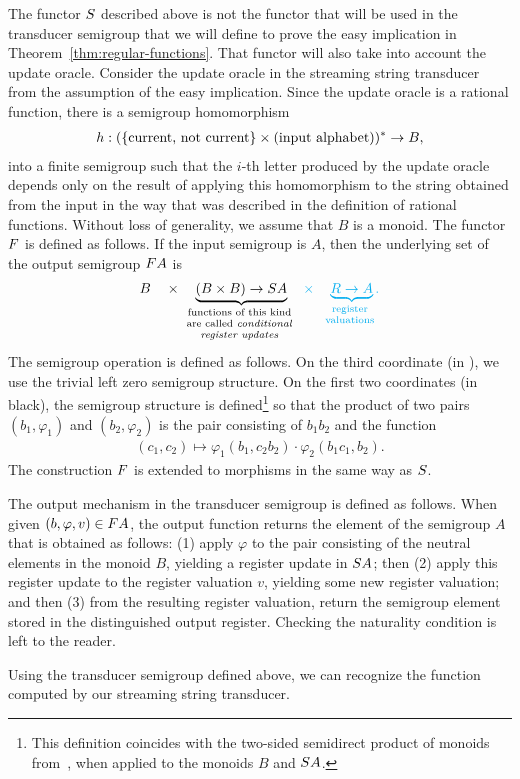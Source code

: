 The functor $\functors$ described above is not the functor that will be used in the transducer semigroup that we will define to prove the easy implication in Theorem~\ref{thm:regular-functions}. That functor will also take into account the update oracle. Consider the update oracle in the streaming string transducer from the assumption of the easy implication. Since the update oracle is a rational function, there is a semigroup homomorphism
\begin{align*}
h : (\{\text{current, not current}\} \times \text{(input alphabet)})^* \to B,
\end{align*}
into a finite semigroup such that the $i$-th letter produced by the update oracle depends only on the result of applying this homomorphism to the string obtained from the input in the way that was described in the definition of rational functions. Without loss of generality, we assume that $B$ is a monoid. The functor $\functor$ is defined as follows. If the input semigroup is $A$, then the underlying set of the output semigroup $\functor A$ is 
\begin{align*}
     B \quad \times \quad \myunderbrace{(B \times B) \to \functors A}{functions of this kind\\ are  called \emph{conditional} \\\emph{register updates}} 
\quad \blue{\times \quad \myunderbrace{R \to A}{register\\ valuations}.}
\end{align*}
The semigroup operation is defined as follows. On the third coordinate (in ), we use the trivial left zero semigroup structure. On the first two coordinates (in black), the semigroup structure is defined\footnote{This definition coincides with the two-sided semidirect product of monoids from~\cite[Section 6]{rhodes1989kernel}, when applied to the monoids $B$ and $\functors A$.} so that the product of two pairs $(b_1,\varphi_1)$ and $(b_2,\varphi_2)$ is  the pair consisting of $b_1 b_2$ and the function  
\begin{align*}
(c_1,c_2)  \mapsto   \varphi_1(b_1,c_2b_2) \cdot \varphi_2(b_1c_1,b_2).
\end{align*}
The construction $\functor$ is extended to morphisms in the same way as $\functors$. 

The output mechanism in the transducer semigroup is defined as follows.  When given $(b,\varphi,v) \in \functor A$, the output function returns the element of the semigroup $A$ that is obtained as follows:  (1) apply  $\varphi$ to the pair consisting of the neutral elements in the monoid $B$, yielding a register update in $\functors A$; then (2) apply this  register update to the register valuation $v$,  yielding some new register valuation; and then (3) from the resulting register valuation, return the semigroup element stored in the distinguished output register.  Checking the naturality condition is left to the reader.

Using the transducer semigroup defined above, we can recognize the function  computed by our streaming string transducer. 

